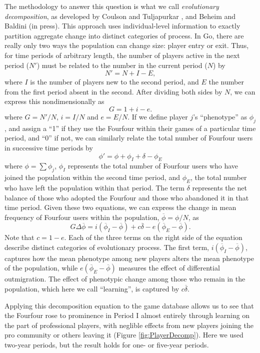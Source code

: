 The methodology to answer this question is what we call \textit{evolutionary decomposition}, as developed by Coulson and Tuljapurkar \citeyearpar{coulson2008dynamics}, and Beheim and Baldini (in press).  This approach uses individual-level information to exactly partition aggregate change into distinct categories of process.  In Go, there are really only two ways the population can change size: player entry or exit.  Thus, for time periods of arbitrary length, the number of players active in the next period ($N'$) must be related to the number in the current period ($N$) by 
	\[				N' = N + I - E,
\]
where $I$ is the number of players new to the second period, and $E$ the number from the first period absent in the second.  After dividing both sides by $N$, we can express this nondimensionally as 
	\[				G = 1+ i - e.
\]
where $G=N'/N$, $i=I/N$ and $e = E/N$.  If we define player $j$'s ``phenotype'' as $\phi_j$, and assign a ``1'' if they use the Fourfour within their games of a particular time period, and ``0'' if not, we can similarly relate the total number of Fourfour users in successive time periods by
	\[\phi' = \phi + \phi_I + \delta - \phi_E
\]
where $\phi = \sum \phi_j$, $\phi_I$ represents the total number of Fourfour users who have joined the population within the second time period, and $\phi_E$, the total number who have left the population within that period.  The term $\delta$ represents the net balance of those who adopted the Fourfour and those who abandoned it in that time period.  Given these two equations, we can express the change in mean frequency of Fourfour users within the population, $\overline{\phi} = \phi/N$, as
	\[	G \Delta \overline{\phi} = i(\overline{\phi}_I - \overline{\phi}) + c \overline{\delta} - e(\overline{\phi}_E - \overline{\phi}).
\]
Note that $c=1-e$.  Each of the three terms on the right side of the equation describe distinct categories of evolutionary process.  The first term, $i(\overline{\phi}_I - \overline{\phi})$, captures how the mean phenotype among new players alters the mean phenotype of the population, while $e(\overline{\phi}_E - \overline{\phi})$ measures the effect of differential outmigration.  The effect of phenotypic change among those who remain in the population, which here we call ``learning'', is captured by $c \overline{\delta}$. 

Applying this decomposition equation to the game database allows us to see that the Fourfour rose to prominence in Period I almost entirely through learning on the part of professional players, with neglible effects from new players joining the pro community or others leaving it (Figure \ref{fig:PlayerDecomp}).  Here we used two-year periods, but the result holds for one- or five-year periods.  

